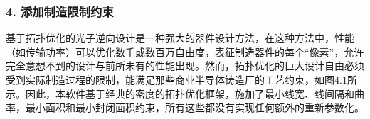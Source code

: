 \documentclass[a4paper,10pt,english]{sphinxmanual}
\begin{document}
\subsubsection{4. 添加制造限制约束}
\label{\detokenize{_u7b80_u4ecb/_u6838_u5fc3_u8bbe_u8ba1_u4f18_u5316_u7b97_u6cd5/_u68af_u5ea6_u62d3_u6251_u4f18_u5316_u6a21_u5757/_u68af_u5ea6_u62d3_u6251_u4f18_u5316_u7b97_u6cd5:id14}}
\sphinxAtStartPar
基于拓扑优化的光子逆向设计是一种强大的器件设计方法，在这种方法中，性能（如传输功率）可以优化数千或数百万自由度，表征制造器件的每个“像素”，允许完全意想不到的设计与前所未有的性能出现。然而，拓扑优化的巨大设计自由必须受到实际制造过程的限制，能满足那些商业半导体铸造厂的工艺约束，如图4.1所示。因此，本软件基于经典的密度的拓扑优化框架，施加了最小线宽、线间隔和曲率，最小面积和最小封闭面积约束，所有这些都没有实现任何额外的重新参数化。

\end{document}
